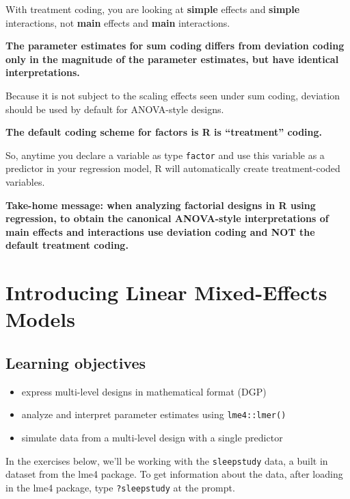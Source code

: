 \documentclass[]{book}
\providecommand{\tightlist}{%
  \setlength{\itemsep}{0pt}\setlength{\parskip}{0pt}}
\begin{document}
With treatment coding, you are looking at \textbf{simple} effects and \textbf{simple} interactions, not \textbf{main} effects and \textbf{main} interactions.

\textbf{The parameter estimates for sum coding differs from deviation coding only in the magnitude of the parameter estimates, but have identical interpretations.}

Because it is not subject to the scaling effects seen under sum coding, deviation should be used by default for ANOVA-style designs.

\textbf{The default coding scheme for factors is R is ``treatment'' coding.}

So, anytime you declare a variable as type \texttt{factor} and use this variable as a predictor in your regression model, R will automatically create treatment-coded variables.

\textbf{Take-home message: when analyzing factorial designs in R using regression, to obtain the canonical ANOVA-style interpretations of main effects and interactions use deviation coding and NOT the default treatment coding.}

\hypertarget{introducing-linear-mixed-effects-models}{%
\chapter{Introducing Linear Mixed-Effects Models}\label{introducing-linear-mixed-effects-models}}

\hypertarget{learning-objectives}{%
\section{Learning objectives}\label{learning-objectives}}

\begin{itemize}
\tightlist
\item
  express multi-level designs in mathematical format (DGP)
\item
  analyze and interpret parameter estimates using \texttt{lme4::lmer()}
\item
  simulate data from a multi-level design with a single predictor
\end{itemize}

In the exercises below, we'll be working with the \texttt{sleepstudy} data, a built in dataset from the lme4 package. To get information about the data, after loading in the lme4 package, type \texttt{?sleepstudy} at the prompt.
\end{document}
